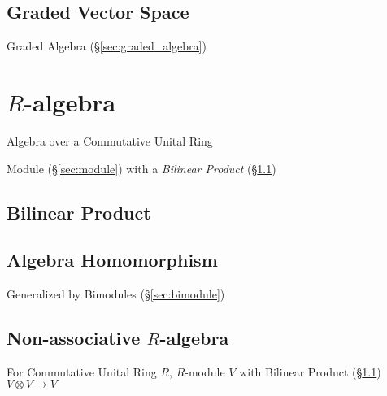 \subsection{Graded Vector Space}\label{sec:graded_vectorspace}

Graded Algebra (\S\ref{sec:graded_algebra})



\section{$R$-algebra}\label{sec:r_algebra}

Algebra over a Commutative Unital Ring

Module (\S\ref{sec:module}) with a \emph{Bilinear Product}
(\S\ref{sec:bilinear_product})



\subsection{Bilinear Product}\label{sec:bilinear_product}

\subsection{Algebra Homomorphism}\label{sec:algebra_homomorphism}

Generalized by Bimodules (\S\ref{sec:bimodule})



\subsection{Non-associative $R$-algebra}
\label{sec:nonassociative_r_algebra}

For Commutative Unital Ring $R$, $R$-module $V$ with Bilinear Product
(\S\ref{sec:bilinear_product}) $V \otimes V \rightarrow V$



